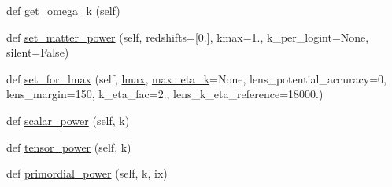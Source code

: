 \begin{DoxyCompactItemize}
\item 
def \mbox{\hyperlink{classcamb_1_1model_1_1CAMBparams_ade7688095ef96fb9ea9c73c2eced355e}{get\+\_\+omega\+\_\+k}} (self)
\item 
def \mbox{\hyperlink{classcamb_1_1model_1_1CAMBparams_a371e933413d954027320de731e4668cb}{set\+\_\+matter\+\_\+power}} (self, redshifts=\mbox{[}0.\mbox{]}, kmax=1., k\+\_\+per\+\_\+logint=None, silent=False)
\item 
def \mbox{\hyperlink{classcamb_1_1model_1_1CAMBparams_a2593dda108c56b3457585037e403236b}{set\+\_\+for\+\_\+lmax}} (self, \mbox{\hyperlink{plotTT_8m_aa9755a1150619f3bbad65080cf613ef8}{lmax}}, \mbox{\hyperlink{classcamb_1_1model_1_1CAMBparams_aa45b95918852065ae4bb41157369d8bd}{max\+\_\+eta\+\_\+k}}=None, lens\+\_\+potential\+\_\+accuracy=0, lens\+\_\+margin=150, k\+\_\+eta\+\_\+fac=2., lens\+\_\+k\+\_\+eta\+\_\+reference=18000.)
\item 
def \mbox{\hyperlink{classcamb_1_1model_1_1CAMBparams_ab0637ffdaf92a718a13b26adc99310ae}{scalar\+\_\+power}} (self, k)
\item 
def \mbox{\hyperlink{classcamb_1_1model_1_1CAMBparams_a846c38cbd0be48719f7ce15710e69523}{tensor\+\_\+power}} (self, k)
\item 
def \mbox{\hyperlink{classcamb_1_1model_1_1CAMBparams_af4f79c770e6a0deeab17f54e07e1d002}{primordial\+\_\+power}} (self, k, ix)
\end{DoxyCompactItemize}
